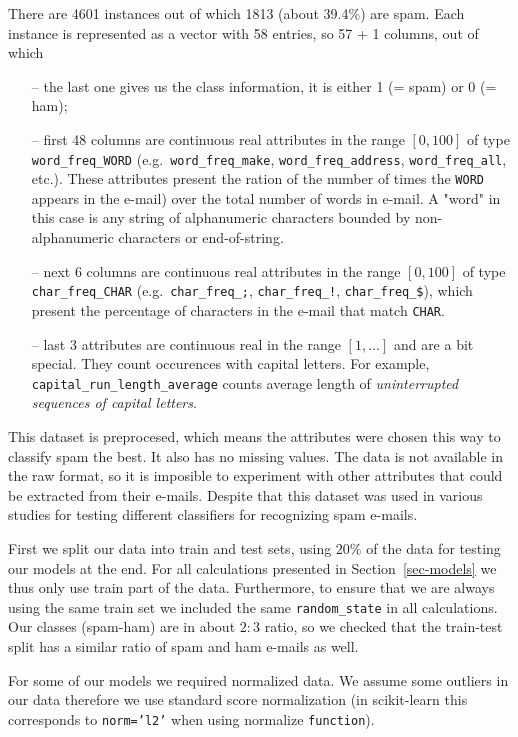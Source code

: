 \documentclass[11pt,a4paper]{article}
\begin{document}
There are 4601 instances out of which 1813 (about 39.4$\%$) are spam. Each instance is represented as a vector with 58 entries, so 57 + 1 columns, out of which
\begin{itemize}
  \item[--] the last one gives us the class information, it is either 1 (= spam) or 0 (= ham);
  \item[--] first 48 columns are continuous real attributes in the range $[0,100]$ of type {\tt word\_freq\_WORD} (e.g.\ {\tt word\_freq\_make}, {\tt word\_freq\_address}, {\tt word\_freq\_all}, etc.). 
  These attributes present the ration of the number of times the {\tt WORD} appears in the e-mail) over the total number of words in e-mail.  A "word" in this case is any 
string of alphanumeric characters bounded by non-alphanumeric characters or end-of-string.
  \item[--] next 6 columns are continuous real attributes in the range $[0,100]$ of type {\tt char\_freq\_CHAR} (e.g.\ {\tt char\_freq\_;}, {\tt char\_freq\_!}, {\tt char\_freq\_\$}), 
  which present the percentage of characters in the e-mail that match {\tt CHAR}.
  \item[--] last 3 attributes are continuous real in the range $[1,\ldots ]$ and are a bit special. They count occurences with capital letters. For example, {\tt capital\_run\_length\_average} counts average length of {\em uninterrupted sequences of capital letters}.
\end{itemize}

This dataset is preprocesed, which means the attributes were chosen this way to classify spam the best. It also has no missing values. The data is not available in the raw format, so it is imposible to experiment with other attributes that could be extracted from their e-mails. Despite that this dataset was used in various studies for testing different classifiers for recognizing spam e-mails.

First we split our data into train and test sets, using $20\%$ of the data for testing our models at the end. For all calculations presented in Section~\ref{sec-models} we thus only use train part of the data. Furthermore, to ensure that we are always using the same train set we included the same {\tt random\_state} in all calculations. Our classes (spam-ham) are in about $2:3$ ratio, so we checked that the train-test split has a similar ratio of spam and ham e-mails as well. 

For some of our models we required normalized data. We assume some outliers in our data therefore we use standard score normalization (in scikit-learn this corresponds to {\tt norm='l2'} when using normalize {\tt function}). 
\end{document}

